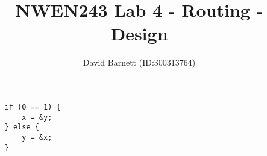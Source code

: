 \documentclass[12pt]{article}
\author{David Barnett (ID:300313764)}
\title{NWEN243 Lab 4 - Routing - Design}
\date{}
\begin{document}
\maketitle

\begin{verbatim}
    if (0 == 1) {
        x = &y;
    } else {
        y = &x;
    }
\end{verbatim}
\end{document}

